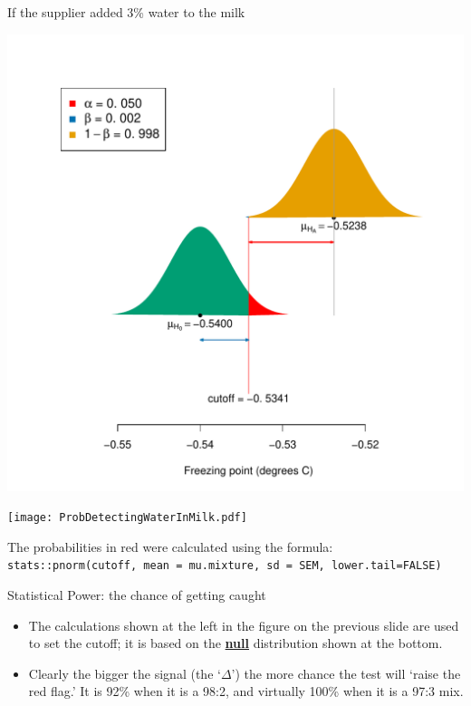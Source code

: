 \documentclass[10pt,handout]{beamer}\usepackage[]{graphicx}\usepackage[]{color}
\makeatletter
\def\maxwidth{ %
  \ifdim\Gin@nat@width>\linewidth
    \linewidth
  \else
    \Gin@nat@width
  \fi
}
\newenvironment{knitrout}{}{} %
\makeatother
\begin{document}
\begin{frame}[fragile]{If the supplier added 3\% water to the milk}
\begin{knitrout}\tiny
{}\color{fgcolor}

{\centering \includegraphics[width=\maxwidth]{figure/unnamed-chunk-10-1} 

}


\end{knitrout}
\end{frame}



\begin{frame}
	
	\begin{center}
		\texttt{[image: ProbDetectingWaterInMilk.pdf]} 
	\end{center}
	
	\vspace*{-0.18in}
	
	{ \footnotesize
		The probabilities in red were calculated using the formula:
		\texttt{stats::pnorm(cutoff, mean = mu.mixture, sd = SEM, lower.tail=FALSE)}
	}
\end{frame}


\begin{frame}{Statistical Power: the chance of getting caught}
	\begin{itemize}
		\setlength\itemsep{1em}
		\item The calculations shown at the left in the figure on the previous slide are used to set  the cutoff; it is based on the \underline{\textbf{null}} distribution shown at the bottom. \pause  
		\item Clearly the bigger the signal (the `$\Delta$') the more chance the test will `raise the red flag.' It is 92\% when it is a 98:2, and virtually 100\% when it is a 97:3 mix.
	\end{itemize}
	
	
\end{frame}
\end{document}
